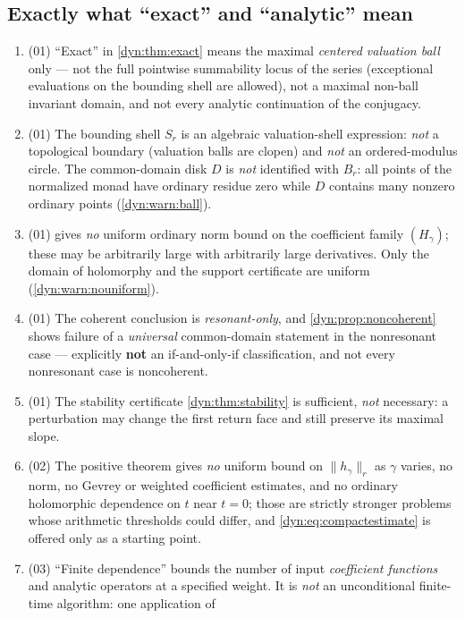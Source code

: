 \documentclass[11pt,letterpaper]{article}
\theoremstyle{definition}
\theoremstyle{remark}
\numberwithin{equation}{section}
\begin{document}
\subsection{Exactly what ``exact'' and ``analytic'' mean}
\begin{enumerate}[label=\textbf{N\arabic*.},leftmargin=3.2em,start=31]
\item (01) ``Exact'' in \cref{dyn:thm:exact} means the maximal
\emph{centered valuation ball} only --- not the full pointwise summability
locus of the series (exceptional evaluations on the bounding shell are
allowed), not a maximal non-ball invariant domain, and not every analytic
continuation of the conjugacy.
\item (01) The bounding shell $S_r$ is an algebraic valuation-shell
expression: \emph{not} a topological boundary (valuation balls are clopen)
and \emph{not} an ordered-modulus circle. The common-domain disk $D$ is
\emph{not} identified with $B_r$: all points of the normalized monad have
ordinary residue zero while $D$ contains many nonzero ordinary points
(\cref{dyn:warn:ball}).
\item (01)  gives \emph{no} uniform ordinary norm
bound on the coefficient family $(H_\gamma)$; these may be arbitrarily
large with arbitrarily large derivatives. Only the domain of holomorphy and
the support certificate are uniform (\cref{dyn:warn:nouniform}).
\item (01) The coherent conclusion is \emph{resonant-only}, and
\cref{dyn:prop:noncoherent} shows failure of a \emph{universal}
common-domain statement in the nonresonant case --- explicitly \textbf{not}
an if-and-only-if classification, and not every nonresonant case is
noncoherent.
\item (01) The stability certificate \cref{dyn:thm:stability} is
sufficient, \emph{not} necessary: a perturbation may change the first
return face and still preserve its maximal slope.
\item (02) The positive theorem gives \emph{no} uniform bound on
$\|h_\gamma\|_r$ as $\gamma$ varies, no norm, no Gevrey or weighted
coefficient estimates, and no ordinary holomorphic dependence on $t$ near
$t=0$; those are strictly stronger problems whose arithmetic thresholds
could differ, and \eqref{dyn:eq:compactestimate} is offered only as a
starting point.
\item (03) ``Finite dependence'' bounds the number of input
\emph{coefficient functions} and analytic operators at a specified weight.
It is \emph{not} an unconditional finite-time algorithm: one application of

\end{enumerate}
\end{document}
